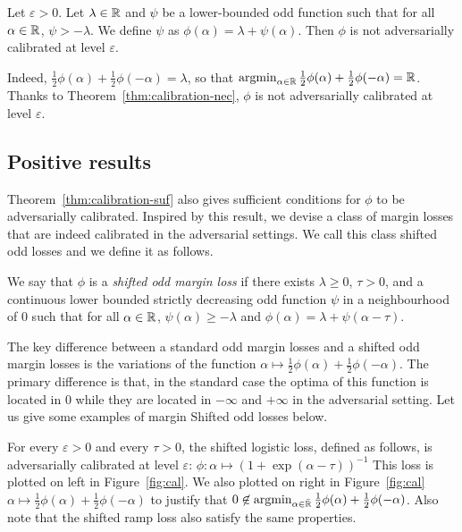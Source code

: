 \begin{coro} Let $\varepsilon>0$. Let $\lambda\in \mathbb{R}$ and \textcolor{black}{$\psi$} be a lower-bounded odd function such that for all $\alpha\in\mathbb{R}$, $\psi>-\lambda$. We define $\psi$ as  $\phi(\alpha) = \lambda +\psi(\alpha)$. Then $\phi$ is not adversarially calibrated at level $\varepsilon$.
\end{coro}
Indeed, $\frac12{\phi}(\alpha)+\frac12{\phi}(-\alpha) =  \lambda$, so that $ \operatorname*{argmin}_{\alpha\in\mathbb{R}}
\frac12\phi(\alpha)+\frac12\phi(-\alpha) = \mathbb{R}$. Thanks to Theorem~\ref{thm:calibration-nec}, $\phi$ is not adversarially calibrated at level $\varepsilon$.


\subsection{Positive results}

Theorem~\ref{thm:calibration-suf} also gives sufficient conditions for $\phi$ to be adversarially calibrated. Inspired by this result, we devise a class of margin losses that are indeed calibrated in the adversarial settings. We call this class shifted odd losses and we define it as follows.
\begin{definition}
\label{def:shifted}
We say that $\phi$ is a \emph{shifted odd margin loss} if there exists $\lambda\geq0$, $\tau>0$, and a continuous lower bounded strictly decreasing odd function \textcolor{black}{$\psi$} in a neighbourhood of $0$ such that for all $\alpha\in\mathbb{R}$, $\psi(\alpha)\geq -\lambda$ and $\phi(\alpha) = \lambda+\psi(\alpha-\tau)$. 
\end{definition}

The key difference between a standard odd margin losses and a shifted odd margin losses is the variations of the function $\alpha\mapsto\frac12\phi(\alpha)+\frac12\phi(-\alpha)$. 
The primary difference is that, in the standard case the optima of this function is located in $0$ while they are located in $-\infty$ and $+\infty$ in the adversarial setting. Let us give some examples of margin Shifted odd losses below.

 
\begin{example*}
For every $\varepsilon>0$ and every $\tau>0$, the shifted logistic loss, defined as follows, is adversarially calibrated at level $\varepsilon$:
$\phi:\alpha\mapsto \left(1+\exp{\left(\alpha-\tau\right)}\right)^{-1}$
This loss is plotted on left in Figure~\ref{fig:cal}. We also plotted on right in Figure~\ref{fig:cal} $\alpha\mapsto\frac12\phi(\alpha)+\frac12\phi(-\alpha)$ to justify that $0\not\in\operatorname*{argmin}_{\alpha\in\bar{\mathbb{R}}}\frac12\phi(\alpha)+\frac12\phi(-\alpha)$. Also note that the shifted ramp loss also satisfy the same properties.
\end{example*}


